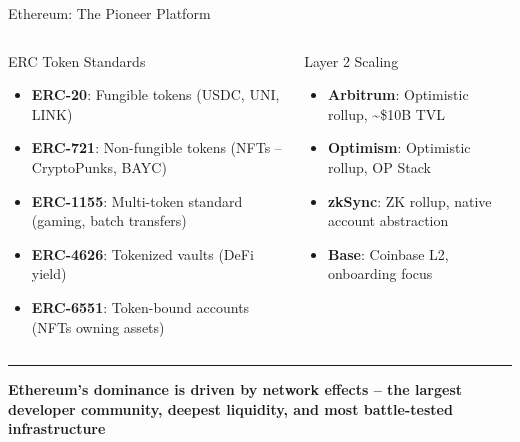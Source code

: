 \documentclass[8pt,aspectratio=169]{beamer}
\newcommand{\bottomnote}[1]{\vfill\vspace{-2mm}\textcolor{mllavender2}{\rule{\textwidth}{0.4pt}}\vspace{1mm}\footnotesize\textbf{#1}}
\begin{document}
\begin{frame}{Ethereum: The Pioneer Platform}
\begin{columns}[T]
\begin{block}{ERC Token Standards}
\footnotesize
\begin{itemize}
  \item \textbf{ERC-20}: Fungible tokens (USDC, UNI, LINK)
  \item \textbf{ERC-721}: Non-fungible tokens (NFTs -- CryptoPunks, BAYC)
  \item \textbf{ERC-1155}: Multi-token standard (gaming, batch transfers)
  \item \textbf{ERC-4626}: Tokenized vaults (DeFi yield)
  \item \textbf{ERC-6551}: Token-bound accounts (NFTs owning assets)
\end{itemize}
\end{block}
\vspace{2mm}
\begin{exampleblock}{Layer 2 Scaling}
\footnotesize
\begin{itemize}
  \item \textbf{Arbitrum}: Optimistic rollup, \textasciitilde\$10B TVL
  \item \textbf{Optimism}: Optimistic rollup, OP Stack
  \item \textbf{zkSync}: ZK rollup, native account abstraction
  \item \textbf{Base}: Coinbase L2, onboarding focus
\end{itemize}
\end{exampleblock}
\end{columns}
\bottomnote{Ethereum's dominance is driven by network effects -- the largest developer community, deepest liquidity, and most battle-tested infrastructure}
\end{frame}
\end{document}
